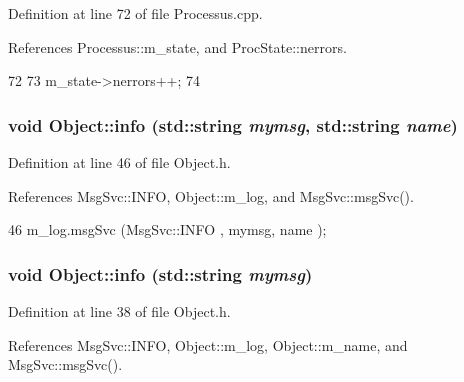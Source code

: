 Definition at line 72 of file Processus.cpp.

References Processus::m\_\-state, and ProcState::nerrors.


\begin{DoxyCode}
72                            {
73   m_state->nerrors++;
74 }
\end{DoxyCode}
\hypertarget{classObject_a1ca123253dfd30fc28b156f521dcbdae}{
\subsubsection[{info}]{\setlength{\rightskip}{0pt plus 5cm}void Object::info (std::string {\em mymsg}, \/  std::string {\em name})}}
\label{classObject_a1ca123253dfd30fc28b156f521dcbdae}


Definition at line 46 of file Object.h.

References MsgSvc::INFO, Object::m\_\-log, and MsgSvc::msgSvc().


\begin{DoxyCode}
46 { m_log.msgSvc (MsgSvc::INFO    , mymsg, name ); }
\end{DoxyCode}
\hypertarget{classObject_a644fd329ea4cb85f54fa6846484b84a8}{
\subsubsection[{info}]{\setlength{\rightskip}{0pt plus 5cm}void Object::info (std::string {\em mymsg})}}
\label{classObject_a644fd329ea4cb85f54fa6846484b84a8}


Definition at line 38 of file Object.h.

References MsgSvc::INFO, Object::m\_\-log, Object::m\_\-name, and MsgSvc::msgSvc().

